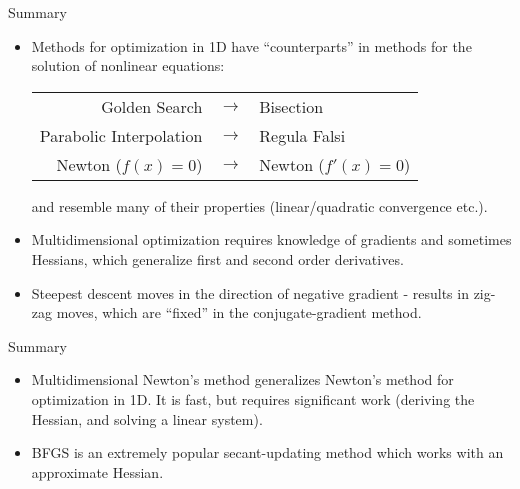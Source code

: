 \documentclass[xcolor=dvipsnames,11pt]{beamer}
\begin{document}
\begin{frame}{Summary}
	\begin{itemize}
		\item Methods for optimization in 1D have ``counterparts'' in methods for the solution of nonlinear equations:
		
		\begin{center}
			\begin{tabular}{rcl}
				Golden Search & $\rightarrow$ & Bisection \\
				Parabolic Interpolation & $\rightarrow$ & Regula Falsi \\
				Newton ($f(x)=0$)  & $\rightarrow$ & Newton ($f'(x)=0$) \\
			\end{tabular}
		\end{center}
		and resemble many of their properties (linear/quadratic convergence etc.).
		\item Multidimensional optimization requires knowledge of gradients and sometimes Hessians, which generalize first and second order derivatives.
		\item Steepest descent moves in the direction of negative gradient - results in zig-zag moves, which are ``fixed'' in the conjugate-gradient method.
	\end{itemize}
\end{frame}


\begin{frame}{Summary}
	\begin{itemize}
		\item Multidimensional Newton's method generalizes Newton's method for optimization in 1D. It is fast, but requires significant work (deriving the Hessian, and solving a linear system).
		\item BFGS is an extremely popular secant-updating method which works with an approximate Hessian.
	\end{itemize}
\end{frame}





\appendix
\end{document}
